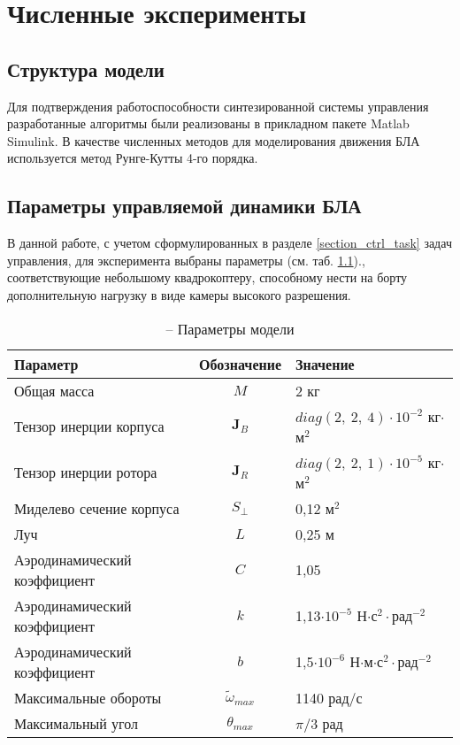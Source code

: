 \chapter{Численные эксперименты}
\label{experiments_chapter}

\section{Структура модели}

Для подтверждения работоспособности синтезированной системы управления разработанные алгоритмы были реализованы в прикладном пакете Matlab Simulink.
В качестве численных методов для моделирования движения БЛА используется метод Рунге-Кутты 4-го порядка.

\section{Параметры управляемой динамики БЛА}

В данной работе, с учетом сформулированных в разделе \ref{section_ctrl_task} задач управления, для эксперимента выбраны параметры (см. таб. \ref{tb:params_table})., соответствующие небольшому квадрокоптеру, способному нести на борту дополнительную нагрузку в виде камеры высокого разрешения.
\begin{table}[h!]
	\centering
	\caption{ -- Параметры модели}\label{tb:params_table} 
	\begin{tabular}{lcl}
		\hline
		Параметр & Обозначение & Значение  \\\hline
		Общая масса & $M$ & 2 кг  \\
		Тензор инерции корпуса & $\bm J_B$ & $diag(2,\ 2,\ 4)\cdot{10^{-2}}$ кг$\cdot$м$^2$  \\
		Тензор инерции ротора & $\bm J_R$ & $diag(2,\ 2,\ 1)\cdot{10^{-5}}$ кг$\cdot$м$^2$  \\
		Миделево сечение корпуса & $S_{\perp}$ & 0,12 м$^2$ \\
		Луч & $L$ & 0,25 м \\
		Аэродинамический коэффициент & $C$ & 1,05\\
		Аэродинамический коэффициент & $k$ & 1,13$\cdot 10^{-5}$ Н$\cdot$с$^2\cdot$рад$^{-2}$ \\		
		Аэродинамический коэффициент & $b$ & 1,5$\cdot 10^{-6}$ Н$\cdot$м$\cdot$с$^2\cdot$рад$^{-2}$ \\		
		Максимальные обороты & $\tilde \omega_{max}$ & 1140 рад/с \\		
		Максимальный угол & $\theta_{max}$ & ${\pi}/{3}$ рад \\
		\hline
	\end{tabular}
\end{table}

